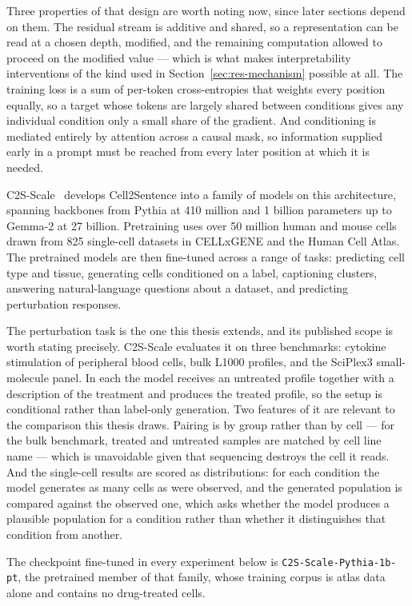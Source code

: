 Three properties of that design are worth noting now, since later sections depend on them. The
residual stream is additive and shared, so a representation can be read at a chosen depth, modified,
and the remaining computation allowed to proceed on the modified value --- which is what makes
interpretability interventions of the kind used in Section~\ref{sec:res-mechanism} possible at all.
The training loss is a sum of per-token cross-entropies that weights every position equally, so a
target whose tokens are largely shared between conditions gives any individual condition only a
small share of the gradient. And conditioning is mediated entirely by attention across a causal
mask, so information supplied early in a prompt must be reached from every later position at which it
is needed.

C2S-Scale~\cite{c2sscale} develops Cell2Sentence into a family of models on this architecture,
spanning backbones from Pythia at 410 million and 1 billion parameters up to Gemma-2 at 27 billion.
Pretraining uses over 50 million human and mouse cells drawn from 825 single-cell datasets in
CELLxGENE and the Human Cell Atlas. The pretrained models are then fine-tuned across a range of
tasks: predicting cell type and tissue, generating cells conditioned on a label, captioning clusters,
answering natural-language questions about a dataset, and predicting perturbation responses.

The perturbation task is the one this thesis extends, and its published scope is worth stating
precisely. C2S-Scale evaluates it on three benchmarks: cytokine stimulation of peripheral blood
cells, bulk L1000 profiles, and the SciPlex3 small-molecule panel. In each the model receives an
untreated profile together with a description of the treatment and produces the treated profile, so
the setup is conditional rather than label-only generation. Two features of it are relevant to the
comparison this thesis draws. Pairing is by group rather than by cell --- for the bulk benchmark,
treated and untreated samples are matched by cell line name --- which is unavoidable given that
sequencing destroys the cell it reads. And the single-cell results are scored as distributions: for
each condition the model generates as many cells as were observed, and the generated population is
compared against the observed one, which asks whether the model produces a plausible population for
a condition rather than whether it distinguishes that condition from another.

The checkpoint fine-tuned in every experiment below is \texttt{C2S-Scale-Pythia-1b-pt}, the
pretrained member of that family, whose training corpus is atlas data alone and contains no
drug-treated cells.

